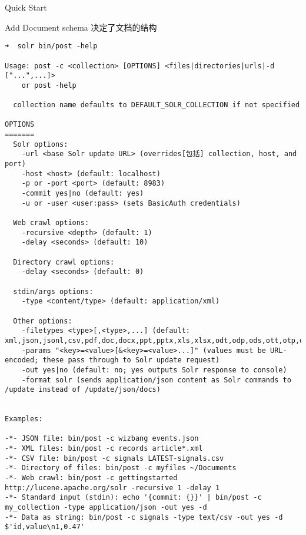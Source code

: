 \documentclass[presentation]{beamer}
\begin{document}
\begin{frame}[fragile,label={sec:org3661264}]{Quick Start}
\begin{block}{Add Document}
schema 决定了文档的结构
\begin{verbatim}
➜  solr bin/post -help

Usage: post -c <collection> [OPTIONS] <files|directories|urls|-d ["...",...]>
    or post -help

  collection name defaults to DEFAULT_SOLR_COLLECTION if not specified

OPTIONS
=======
  Solr options:
    -url <base Solr update URL> (overrides[包括] collection, host, and port)
    -host <host> (default: localhost)
    -p or -port <port> (default: 8983)
    -commit yes|no (default: yes)
    -u or -user <user:pass> (sets BasicAuth credentials)

  Web crawl options:
    -recursive <depth> (default: 1)
    -delay <seconds> (default: 10)

  Directory crawl options:
    -delay <seconds> (default: 0)

  stdin/args options:
    -type <content/type> (default: application/xml)

  Other options:
    -filetypes <type>[,<type>,...] (default: xml,json,jsonl,csv,pdf,doc,docx,ppt,pptx,xls,xlsx,odt,odp,ods,ott,otp,ots,rtf,htm,html,txt,log)
    -params "<key>=<value>[&<key>=<value>...]" (values must be URL-encoded; these pass through to Solr update request)
    -out yes|no (default: no; yes outputs Solr response to console)
    -format solr (sends application/json content as Solr commands to /update instead of /update/json/docs)


Examples:

-*- JSON file: bin/post -c wizbang events.json
-*- XML files: bin/post -c records article*.xml
-*- CSV file: bin/post -c signals LATEST-signals.csv
-*- Directory of files: bin/post -c myfiles ~/Documents
-*- Web crawl: bin/post -c gettingstarted http://lucene.apache.org/solr -recursive 1 -delay 1
-*- Standard input (stdin): echo '{commit: {}}' | bin/post -c my_collection -type application/json -out yes -d
-*- Data as string: bin/post -c signals -type text/csv -out yes -d $'id,value\n1,0.47'
\end{verbatim}
\end{block}



\end{frame}
\end{document}

